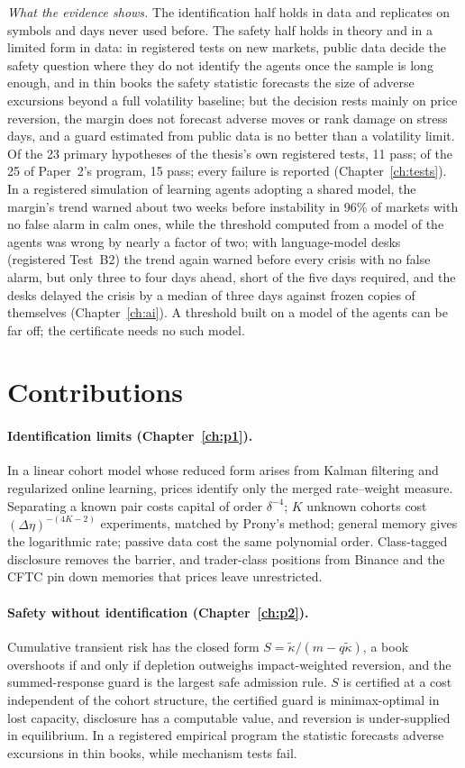 \emph{What the evidence shows.} The identification half holds in data and replicates on symbols and days never used before. The safety half holds in theory and in a limited form in data: in registered tests on new markets, public data decide the safety question where they do not identify the agents once the sample is long enough, and in thin books the safety statistic forecasts the size of adverse excursions beyond a full volatility baseline; but the decision rests mainly on price reversion, the margin does not forecast adverse moves or rank damage on stress days, and a guard estimated from public data is no better than a volatility limit. Of the 23 primary hypotheses of the thesis's own registered tests, 11 pass; of the 25 of Paper~2's program, 15 pass; every failure is reported (Chapter~\ref{ch:tests}). In a registered simulation of learning agents adopting a shared model, the margin's trend warned about two weeks before instability in 96\% of markets with no false alarm in calm ones, while the threshold computed from a model of the agents was wrong by nearly a factor of two; with language-model desks (registered Test~B2) the trend again warned before every crisis with no false alarm, but only three to four days ahead, short of the five days required, and the desks delayed the crisis by a median of three days against frozen copies of themselves (Chapter~\ref{ch:ai}). A threshold built on a model of the agents can be far off; the certificate needs no such model.

\section{Contributions}

\paragraph{Identification limits (Chapter~\ref{ch:p1}).} In a linear cohort model whose reduced form arises from Kalman filtering and regularized online learning, prices identify only the merged rate--weight measure. Separating a known pair costs capital of order $\delta^{-4}$; $K$ unknown cohorts cost $(\Delta\eta)^{-(4K-2)}$ experiments, matched by Prony's method; general memory gives the logarithmic rate; passive data cost the same polynomial order. Class-tagged disclosure removes the barrier, and trader-class positions from Binance and the CFTC pin down memories that prices leave unrestricted.

\paragraph{Safety without identification (Chapter~\ref{ch:p2}).} Cumulative transient risk has the closed form $S=\tilde\kappa/(m-q\tilde\kappa)$, a book overshoots if and only if depletion outweighs impact-weighted reversion, and the summed-response guard is the largest safe admission rule. $S$ is certified at a cost independent of the cohort structure, the certified guard is minimax-optimal in lost capacity, disclosure has a computable value, and reversion is under-supplied in equilibrium. In a registered empirical program the statistic forecasts adverse excursions in thin books, while mechanism tests fail.

